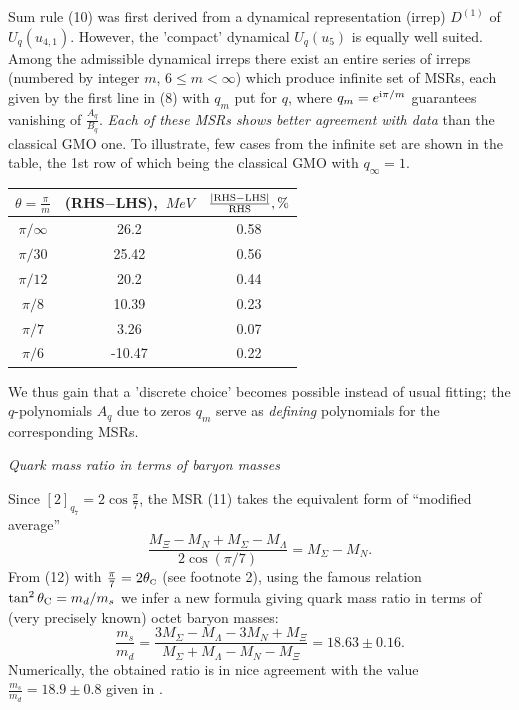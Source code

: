 \documentclass[twoside]{article}
\newcommand{\scr}{\rm\scriptscriptstyle}
\begin{document}
Sum rule (10) was first derived \cite{ga-bre} from a dynamical
representation (irrep) $D^{(1)}$ of $U_q(u_{4,1})$.
However, the 'compact' dynamical $U_q(u_5)$ is equally well suited.
Among the admissible dynamical irreps there exist an entire series
of irreps (numbered by integer $m$, $6\le m<\infty $) which produce
infinite set of MSRs, each given by the first line in (8)
with $q_m$ put for $q$, where $q_m=e^{{\rm i}\pi/m}$ guarantees
vanishing of $\frac{A_q}{B_q}$.
{\it Each of these MSRs shows better agreement with data} than the
classical GMO one.  To illustrate, few cases from the infinite set
are shown in the table, the 1st row of which being the classical GMO
with $q_{\infty}=1$.
\vspace{1.0mm}
\begin{center}
\begin{tabular}{ccc}
\hline
$\theta=\frac{\pi}{m}$  &  (RHS$-$LHS),\  $MeV$  &
       $\frac{\left| {\rm RHS}-{\rm LHS}\right|}{{\rm RHS} }, \%$ \\
\hline
$\pi /\infty$ &  26.2    &   0.58 \\
$\pi /30$    &   25.42   &   0.56 \\
$\pi /12$    &   20.2    &   0.44 \\
$\pi /8$     &   10.39   &   0.23 \\
$\pi /7$     &    3.26   &   0.07  \\
$\pi /6$     &  -10.47   &   0.22  \\
\hline
\end{tabular}
\end{center}
\vspace{1.0mm}
We thus gain that a 'discrete choice' becomes possible
instead of usual fitting; the $q$-polynomials $A_q$
due to zeros $q_m$ serve as {\it defining} polynomials
for the corresponding MSRs.

\begin{center}
{\it Quark mass ratio in terms of baryon masses }
\end{center}

Since $[2]_{q_7}=2\cos\frac\pi7$, the MSR (11)
takes the equivalent form of ``modified average''
\begin{equation}
\frac{ M_{\Xi}-M_{N}+M_{\Sigma}-M_{\Lambda} }{ 2\cos(\pi/7) } =
            M_{\Sigma}-M_{N} .                          \label{(12)}
\end{equation}
From (12) with $\frac{\pi}{7}=2\theta_{\scr C}$ (see footnote 2),
using the famous relation      \cite{cab-ma}
$\tan^2\theta_{\rm C}=m_d/m_s$ we infer a new formula giving quark
mass ratio in terms of (very precisely known) octet baryon masses:
\[
\frac{m_s}{m_d} = \frac{ 3 M_{\Sigma}-M_{\Lambda}-3M_{N}+M_{\Xi} }
                       { M_{\Sigma}+M_{\Lambda}-M_{N}-M_{\Xi} }
                   = 18.63\pm 0.16 .
\]
Numerically, the obtained ratio is in nice agreement with
the value $\frac{m_s}{m_d}{=}18.9\pm 0.8$ given in \cite{leu00}.
\end{document}
